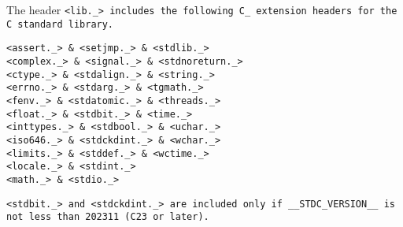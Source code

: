 The header \tt{<lib._>} includes the following \tt{C_}
extension headers for the C standard library.


\tt  {<assert._>} & \tt   {<setjmp._>} & \tt     {<stdlib._>}\\

\tt {<complex._>} & \tt   {<signal._>} & \tt{<stdnoreturn._>}\\

\tt   {<ctype._>} & \tt {<stdalign._>} & \tt     {<string._>}\\

\tt   {<errno._>} & \tt   {<stdarg._>} & \tt     {<tgmath._>}\\

\tt    {<fenv._>} & \tt{<stdatomic._>} & \tt    {<threads._>}\\

\tt   {<float._>} & \tt   {<stdbit._>} & \tt       {<time._>}\\

\tt{<inttypes._>} & \tt  {<stdbool._>} & \tt      {<uchar._>}\\

\tt  {<iso646._>} & \tt{<stdckdint._>} & \tt      {<wchar._>}\\

\tt  {<limits._>} & \tt   {<stddef._>} & \tt     {<wctime._>}\\

\tt  {<locale._>} & \tt   {<stdint._>}\\

\tt    {<math._>} & \tt    {<stdio._>}\\

\elbat

\tt{<stdbit._>} and \tt{<stdckdint._>} are included only if
\tt{__STDC_VERSION__} is not less than 202311 (C23 or later).
